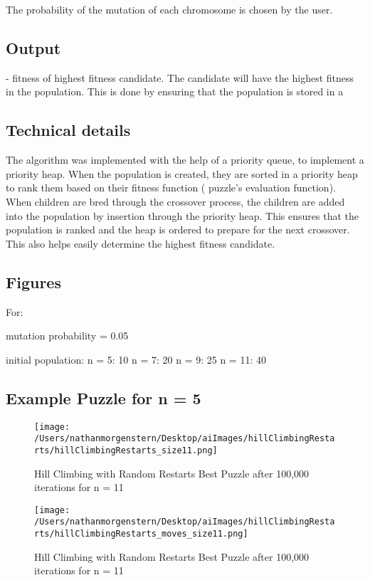 \documentclass{report}
\begin{document}
The probability of the mutation of each chromosome is chosen by the user.	


\subsection{Output}
	- fitness of highest fitness candidate.
The candidate will have the highest fitness in the population. This is done by ensuring that the population is stored in a 


\subsection{Technical details}
The algorithm was implemented with the help of a priority queue, to implement a priority heap. When the population is created, they are sorted in a priority heap to rank them based on their fitness function ( puzzle's evaluation function). When children are bred through the crossover process, the children are added into the population by insertion through the priority heap. This ensures that the population is ranked and the heap is ordered to prepare for the next crossover. This also helps easily determine the highest fitness candidate.

\subsection{Figures}
For:

mutation probability = 0.05

initial population:
n = 5: 10
n = 7: 20
n = 9: 25
n = 11: 40




\subsection{Example Puzzle for n = 5}
	\begin{figure}[H]
	\centering
	\texttt{[image: /Users/nathanmorgenstern/Desktop/aiImages/hillClimbingRestarts/hillClimbingRestarts\_size11.png]}
	\caption{Hill Climbing with Random Restarts Best Puzzle after 100,000 iterations for n = 11} 
	\label{fig: Hill Climbing with Random Restarts Best Puzzle after 100,000 iterations for n = 11}
	\end{figure}
	
	\begin{figure}[H]
	\centering
	\texttt{[image: /Users/nathanmorgenstern/Desktop/aiImages/hillClimbingRestarts/hillClimbingRestarts\_moves\_size11.png]}
	\caption{Hill Climbing with Random Restarts Best Puzzle after 100,000 iterations for n = 11} 
	\label{fig: Hill Climbing with Random Restarts Best Puzzle after 100,000 iterations for n = 11}
	\end{figure}
\end{document}
